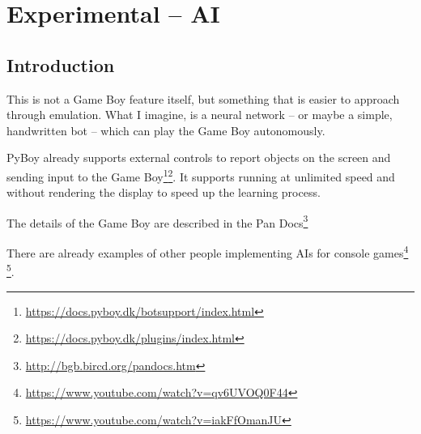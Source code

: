 \documentclass[11pt]{report} %
\begin{document}
\chapter*{Experimental -- AI}
\section*{Introduction}
This is not a Game Boy feature itself, but something that is easier to approach through emulation. What I imagine, is a neural network -- or maybe a simple, handwritten bot -- which can play the Game Boy autonomously.

PyBoy already supports external controls to report objects on the screen and sending input to the Game Boy\footnote{\url{https://docs.pyboy.dk/botsupport/index.html}}\footnote{\url{https://docs.pyboy.dk/plugins/index.html}}. It supports running at unlimited speed and without rendering the display to speed up the learning process.

The details of the Game Boy are described in the Pan Docs\footnote{\url{http://bgb.bircd.org/pandocs.htm}}

There are already examples of other people implementing AIs for console games\footnote{\url{https://www.youtube.com/watch?v=qv6UVOQ0F44}} \footnote{\url{https://www.youtube.com/watch?v=iakFfOmanJU}}.
\end{document}
